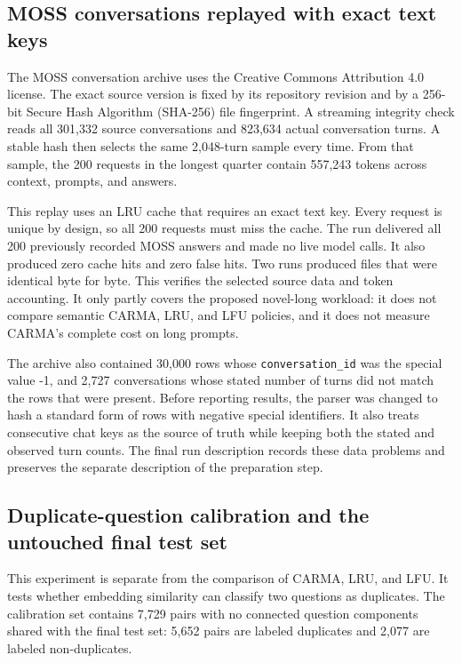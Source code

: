 \documentclass[10pt,letterpaper]{article}
\newcommand{\code}[1]{\texttt{#1}}
\begin{document}
\FloatBarrier

\subsection{MOSS conversations replayed with exact text keys}

The MOSS conversation archive \cite{moss-source} uses the Creative Commons
Attribution 4.0 license. The exact source version is fixed by its repository
revision and by a 256-bit Secure Hash Algorithm (SHA-256) file fingerprint. A
streaming integrity check reads all 301,332 source conversations and 823,634
actual conversation turns. A stable hash then selects the same 2,048-turn
sample every time. From that sample, the 200 requests in the longest quarter
contain 557,243 tokens across context, prompts, and answers.

This replay uses an LRU cache that requires an exact text key. Every request is
unique by design, so all 200 requests must miss the cache. The run delivered
all 200 previously recorded MOSS answers and made no live model calls. It also
produced zero cache hits and zero false hits. Two runs produced files that were
identical byte for byte. This verifies the selected source data and token
accounting. It only partly covers the proposed novel-long workload: it does not
compare semantic CARMA, LRU, and LFU policies, and it does not measure CARMA's
complete cost on long prompts.

The archive also contained 30,000 rows whose
\code{conversation\_id} was the special value -1, and 2,727 conversations
whose stated number of turns did not match the rows that were present. Before
reporting results, the parser was changed to hash a standard form of rows with
negative special identifiers. It also treats consecutive chat keys as the
source of truth while keeping both the stated and observed turn counts. The
final run description records these data problems and preserves the separate
description of the preparation step.

\subsection{Duplicate-question calibration and the untouched final test set}\label{sec:qqp-calibration}

This experiment is separate from the comparison of CARMA, LRU, and LFU. It
tests whether embedding similarity can classify two questions as duplicates.
The calibration set contains 7,729 pairs with no connected question components
shared with the final test set: 5,652 pairs are labeled duplicates and 2,077
are labeled non-duplicates.
\end{document}

